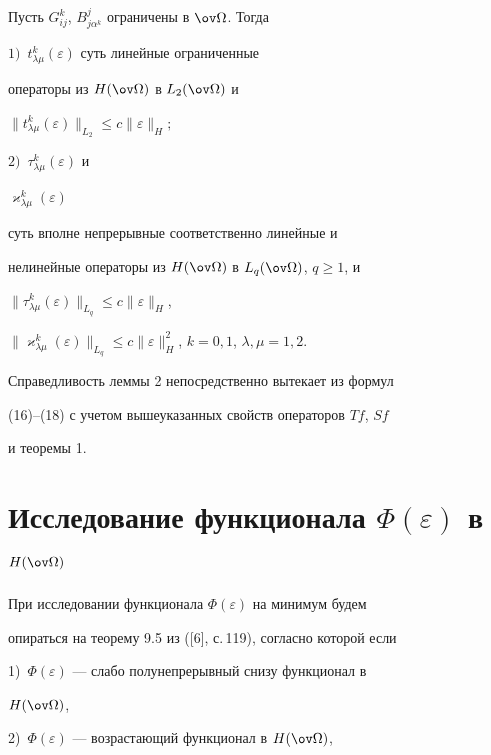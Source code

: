  


\begin{lem} 


Пусть $G^k_{ij}$, $B^j_{j\alpha^k}$ ограничены в $\ov\Omega$. Тогда 


$1)$~$t^k_{\lambda\mu}(\varepsilon)$ суть линейные ограниченные 


операторы из $H(\ov\Omega)$ в $L_2(\ov\Omega)$ и 


$\|t^k_{\lambda\mu}(\varepsilon)\|_{L_2}\le c\|\varepsilon\|_H;$ 


$2)$~$\tau^k_{\lambda\mu}(\varepsilon)$ и 


$\varkappa^k_{\lambda\mu}(\varepsilon)$ 


суть вполне непрерывные соответственно линейные и 


нелинейные операторы из $H(\ov\Omega)$ в $L_q(\ov\Omega)$, $q\ge1$, и 


$\|\tau^k_{\lambda\mu}(\varepsilon)\|_{L_q}\le c\|\varepsilon\|_H$, 


$\|\varkappa^k_{\lambda\mu}(\varepsilon)\|_{L_q}\le 


c\|\varepsilon\|^2_H$, $k=0,1$, $\lambda,\mu=1,2$. 


\end{lem} 


 


Справедливость леммы 2 непосредственно вытекает из формул 


(16)--(18) с учетом вышеуказанных свойств операторов $T f$, $S f$ 


и теоремы 1. 


 


\section{Исследование функционала $\Phi(\varepsilon)$ в $H(\ov\Omega)$} 


 


При исследовании функционала $\Phi(\varepsilon)$ на минимум будем 


опираться на теорему 9.5 из ([6], с.\,119), согласно которой если 


1)~$\Phi(\varepsilon)$ --- слабо полунепрерывный снизу функционал в 


$H(\ov\Omega)$, 


2)~$\Phi(\varepsilon)$ --- возрастающий функционал в $H(\ov\Omega)$, 


